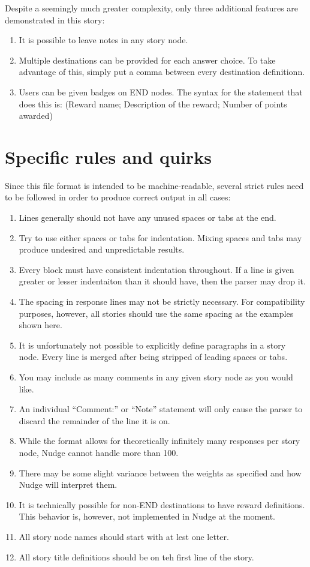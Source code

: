 \documentclass[12pt,letterpaper]{article}
\begin{document}
Despite a seemingly much greater complexity, only three additional features are demonstrated in this story:
\begin{enumerate}
 \item It is possible to leave notes in any story node.
 \item Multiple destinations can be provided for each answer choice. To take advantage of this, simply put a comma between every destination definitionn.
 \item Users can be given badges on END nodes. The syntax for the statement that does this is: (Reward name; Description of the reward; Number of points awarded)
\end{enumerate}

\section{Specific rules and quirks}
Since this file format is intended to be machine-readable, several strict rules need to be followed in order to produce correct output in all cases\footnotemark[3]:

\begin{enumerate}
 \item Lines generally should not have any unused spaces or tabs at the end.
 \item Try to use either spaces or tabs for indentation. Mixing spaces and tabs may produce undesired and unpredictable results.
 \item Every block must have consistent indentation throughout. If a line is given greater or lesser indentaiton than it should have, then the parser may drop it.
 \item The spacing in response lines may not be strictly necessary. For compatibility purposes, however, all stories should use the same spacing as the examples shown here.
 \item It is unfortunately not possible to explicitly define paragraphs in a story node. Every line is merged after being stripped of leading spaces or tabs.
 \item You may include as many comments in any given story node as you would like.
 \item An individual ``Comment:'' or ``Note'' statement will only cause the parser to discard the remainder of the line it is on.
 \item While the format allows for theoretically infinitely many responses per story node, Nudge cannot handle more than 100.
 \item There may be some slight variance between the weights as specified and how Nudge will interpret them.
 \item It is technically possible for non-END destinations to have reward definitions. This behavior is, however, not implemented in Nudge at the moment.
 \item All story node names should start with at lest one letter.
 \item All story title definitions should be on teh first line of the story.
\end{enumerate}
    
\end{document}

